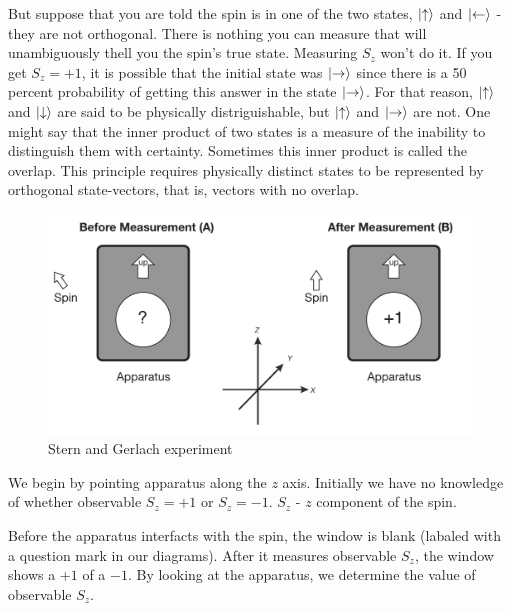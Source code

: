 \documentclass{article}
\begin{document}
But suppose that you are told the spin is in one of the two states, $\ket{\uparrow}$ and $\ket{\leftarrow}$ - they are not orthogonal. There is nothing you can measure that will unambiguously thell you the spin's true state. Measuring $S_z$ won't do it. If you get $S_z = + 1$, it is possible that the initial state was $\ket{\rightarrow}$ since there is a 50 percent probability of getting this answer in the state $\ket{\rightarrow}$. For that reason, $\ket{\uparrow}$ and  $\ket{\downarrow}$ are said to be physically distriguishable, but  $\ket{\uparrow}$ and  $\ket{\rightarrow}$ are not. One might say that the inner product of two states is a measure of the inability to distinguish them with certainty. Sometimes this inner product is called the overlap. This principle requires physically distinct states to be represented by orthogonal state-vectors, that is, vectors with no overlap. 



\begin{figure}[!htbp]
\centering
\includegraphics[scale=0.4]{stern_and_gerlach}
\caption{Stern and Gerlach experiment}\label{stern_and_gerlach_pic}
\end{figure}


We begin by pointing apparatus along the $z$ axis. Initially we have no knowledge of whether observable $S_z = + 1$ or $S_z = - 1$. $S_z$ - $z$ component of the spin.

Before the apparatus interfacts with the spin, the window is blank (labaled with a question mark in our diagrams).
After it measures observable $S_z$, the window shows a $+1$ of a $-1$. By looking at the apparatus, we determine the value of observable $S_z$.
\end{document}
